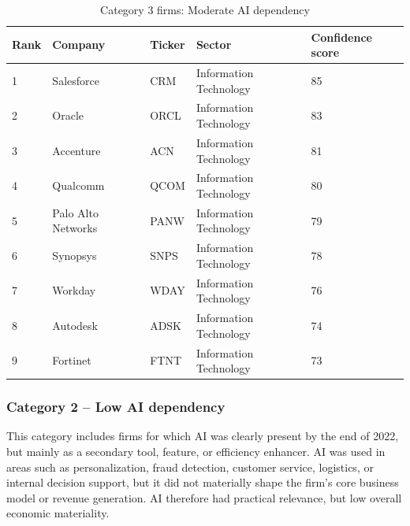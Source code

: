 \documentclass{article}
\begin{document}
\begin{table}[H]
\centering
\caption{Category 3 firms: Moderate AI dependency}
\small
\renewcommand{\arraystretch}{1.15}
\begin{tabularx}{\textwidth}{@{} C{1.1cm} L{4.2cm} C{1.6cm} L{4.3cm} C{2.3cm} @{}}
\toprule
\textbf{Rank} & \textbf{Company} & \textbf{Ticker} & \textbf{Sector} & \textbf{Confidence score} \\
 & Salesforce & CRM & Information Technology & 85 \\
2 & Oracle & ORCL & Information Technology & 83 \\
3 & Accenture & ACN & Information Technology & 81 \\
4 & Qualcomm & QCOM & Information Technology & 80 \\
5 & Palo Alto Networks & PANW & Information Technology & 79 \\
6 & Synopsys & SNPS & Information Technology & 78 \\
7 & Workday & WDAY & Information Technology & 76 \\
8 & Autodesk & ADSK & Information Technology & 74 \\
9 & Fortinet & FTNT & Information Technology & 73 \\
\bottomrule
\end{tabularx}
\label{tab:category3}
\end{table}

\subsubsection*{Category 2 -- Low AI dependency}

This category includes firms for which AI was clearly present by the end of 2022, but mainly as a secondary tool, feature, or efficiency enhancer. AI was used in areas such as personalization, fraud detection, customer service, logistics, or internal decision support, but it did not materially shape the firm’s core business model or revenue generation. AI therefore had practical relevance, but low overall economic materiality.
\end{document}
